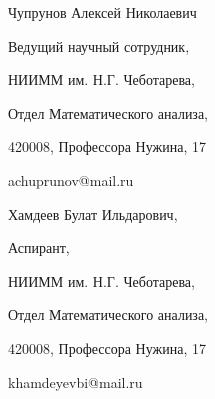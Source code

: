 Чупрунов Алексей Николаевич





Ведущий научный сотрудник,








 НИИММ им. Н.Г. Чеботарева,





 Отдел Математического анализа,





 420008, Профессора Нужина, 17





achuprunov@mail.ru





\medskip





Хамдеев Булат Ильдарович,





Аспирант,








 НИИММ им. Н.Г. Чеботарева,





 Отдел Математического анализа,





 420008, Профессора Нужина, 17





khamdeyevbi@mail.ru


